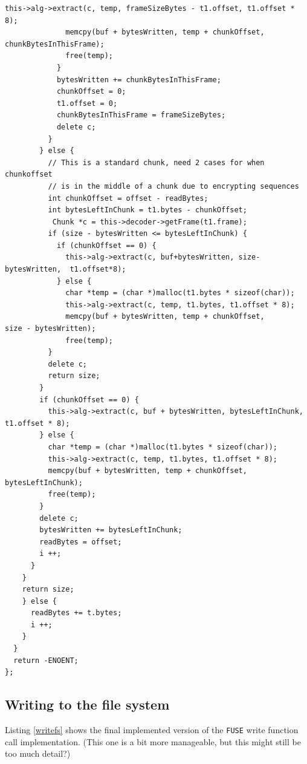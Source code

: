 \documentclass[paper=a4, fontsize=11pt,twoside]{scrartcl}
\numberwithin{table}{section}
\numberwithin{figure}{section}
\numberwithin{algorithm}{section}
\begin{document}
\begin{lstlisting}[caption={\texttt{FUSE} read function call implementation.}, frame=single, label=readfs,showstringspaces=false,upquote=true]
              this->alg->extract(c, temp, frameSizeBytes - t1.offset, t1.offset * 8);
              memcpy(buf + bytesWritten, temp + chunkOffset, chunkBytesInThisFrame);
              free(temp);
            }
            bytesWritten += chunkBytesInThisFrame;
            chunkOffset = 0;
            t1.offset = 0;
            chunkBytesInThisFrame = frameSizeBytes;
            delete c;
          }
        } else {
          // This is a standard chunk, need 2 cases for when chunkoffset
          // is in the middle of a chunk due to encrypting sequences
          int chunkOffset = offset - readBytes;
          int bytesLeftInChunk = t1.bytes - chunkOffset;
           Chunk *c = this->decoder->getFrame(t1.frame);
          if (size - bytesWritten <= bytesLeftInChunk) {
            if (chunkOffset == 0) {
              this->alg->extract(c, buf+bytesWritten, size-bytesWritten,  t1.offset*8);
            } else {
              char *temp = (char *)malloc(t1.bytes * sizeof(char));
              this->alg->extract(c, temp, t1.bytes, t1.offset * 8);
              memcpy(buf + bytesWritten, temp + chunkOffset,            size - bytesWritten);
              free(temp);
          }
          delete c;
          return size;
        }
        if (chunkOffset == 0) {
          this->alg->extract(c, buf + bytesWritten, bytesLeftInChunk, t1.offset * 8);
        } else {
          char *temp = (char *)malloc(t1.bytes * sizeof(char));
          this->alg->extract(c, temp, t1.bytes, t1.offset * 8);
          memcpy(buf + bytesWritten, temp + chunkOffset, bytesLeftInChunk);
          free(temp);
        }
        delete c;
        bytesWritten += bytesLeftInChunk;
        readBytes = offset;
        i ++;
      }
    }
    return size;
    } else {
      readBytes += t.bytes;
      i ++;
    }
  }
  return -ENOENT;
};
\end{lstlisting}

\subsection{Writing to the file system}
\label{app:codewrite}

Listing \ref{writefs} shows the final implemented version of the \texttt{FUSE} write function call implementation. (This one is a bit more manageable, but this might still be too much detail?)
\end{document}
